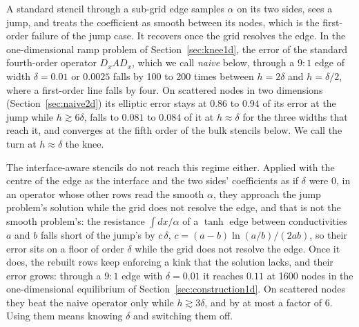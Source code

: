 \documentclass[11pt]{amsart}
\theoremstyle{definition}
\theoremstyle{remark}
\begin{document}
A standard stencil through a sub-grid edge samples $\alpha$ on its two
sides, sees a jump, and treats the coefficient as smooth between its nodes,
which is the first-order failure of the jump case. It recovers once the grid
resolves the edge. In the one-dimensional ramp problem of
Section~\ref{sec:knee1d}, the error of the standard fourth-order operator
$D_x A D_x$, which we call \emph{naive} below, through a $9 : 1$ edge of width $\delta = 0.01$ or $0.0025$ falls by 100 to
200 times between $h = 2\delta$ and $h = \delta/2$, where a first-order line
falls by four. On scattered nodes in two dimensions
(Section~\ref{sec:naive2d}) its elliptic error stays at $0.86$ to $0.94$ of
its error at the jump while $h \gtrsim 6\delta$, falls to $0.081$ to
$0.084$ of it at $h \approx \delta$ for the three widths that reach it, and
converges at the fifth order of the bulk stencils below. We call the turn at
$h \approx \delta$ the knee.

The interface-aware stencils do not reach this regime either. Applied with
the centre of the edge as the interface and the two sides' coefficients as
if $\delta$ were $0$, in an operator whose other rows read the smooth
$\alpha$, they approach the jump problem's solution while the grid does not
resolve the edge, and that is not the smooth problem's: the resistance $\int dx / \alpha$ of a $\tanh$ edge
between conductivities $a$ and $b$ falls short of the jump's by $c\,\delta$,
$c = (a - b) \ln(a/b) / (2ab)$, so their error sits on a floor of order
$\delta$ while the grid does not resolve the edge. Once it does, the rebuilt
rows keep enforcing a kink that the solution lacks, and their error grows:
through a $9 : 1$ edge with $\delta = 0.01$ it reaches $0.11$ at 1600
nodes in the one-dimensional equilibrium of
Section~\ref{sec:construction1d}. On scattered nodes they
beat the naive operator only while $h \gtrsim 3\delta$, and by at most a
factor of $6$. Using them means knowing $\delta$ and switching them off.
\end{document}

